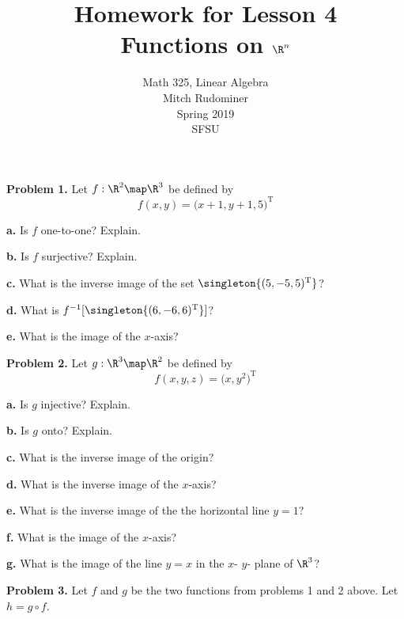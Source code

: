 \documentclass[oneside,12pt]{amsart}
\begin{document}
\title{Homework for Lesson 4 \\ Functions on $\R^n$}
\author{Math 325, Linear Algebra \\ Mitch Rudominer \\ Spring 2019 \\ SFSU }
\date{}

\maketitle


\textbf{Problem 1.} Let $f:\R^2\map\R^3$ be defined by
$$f(x,y) = \big(x+1, y+1,5 \big)^{\text{T}}$$

\textbf{a.} Is $f$ one-to-one? Explain.

\bigskip

\textbf{b.} Is $f$ surjective? Explain.

\bigskip

\textbf{c.} What is the inverse image of the set $\singleton{(5, -5, 5)^{\text{T}}}$?

\bigskip

\textbf{d.} What is $f^{-1}[\singleton{(6, -6, 6)^{\text{T}}}]$?

\bigskip

\textbf{e.} What is the image of the $x$-axis?

\bigskip

\textbf{Problem 2.} Let $g:\R^3\map\R^2$ be defined by
$$f(x,y,z) = \big(x, y^2 \big)^{\text{T}}$$

\textbf{a.} Is $g$ injective? Explain.

\bigskip

\textbf{b.} Is $g$ onto? Explain.

\bigskip

\textbf{c.} What is the inverse image of the origin?

\bigskip

\textbf{d.} What is the inverse image of the $x$-axis?

\bigskip

\textbf{e.} What is the inverse image of the the horizontal line $y=1$?

\bigskip

\textbf{f.} What is the image of the $x$-axis?

\bigskip

\textbf{g.} What is the image of the line $y=x$ in the $x$- $y$- plane
of $\R^3$?

\bigskip

\textbf{Problem 3.} Let $f$ and $g$ be the two functions from problems
1 and 2 above. Let $h = g \circ f$.
\end{document}
